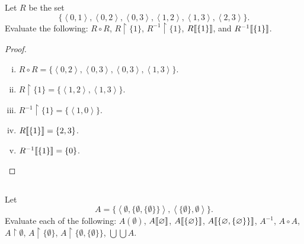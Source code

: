 \documentclass{report}
\begin{document}
\subsection{}%
\label{sub:exercise-3.18}

Let $R$ be the set
  $$\{ \left< 0, 1 \right>, \left< 0, 2 \right>, \left< 0, 3 \right>,
       \left< 1, 2 \right>, \left< 1, 3 \right>, \left< 2, 3 \right>\}.$$
Evaluate the following: $R \circ R$, $R \restriction \{1\}$,
  $R^{-1} \restriction \{1\}$, $R\!\left\llbracket\{1\}\right\rrbracket$, and $R^{-1}\!\left\llbracket\{1\}\right\rrbracket$.

\begin{proof}

  \begin{enumerate}[(i)]
    \item $R \circ R = \{
      \left< 0, 2 \right>,
      \left< 0, 3 \right>,
      \left< 0, 3 \right>,
      \left< 1, 3 \right>
    \}$.
    \item $R \restriction \{1\} = \{
      \left< 1, 2 \right>,
      \left< 1, 3 \right>
    \}$.
    \item $R^{-1} \restriction \{1\} = \{\left< 1, 0 \right>\}$.
    \item $R\!\left\llbracket\{1\}\right\rrbracket = \{2, 3\}$.
    \item $R^{-1}\!\left\llbracket\{1\}\right\rrbracket = \{0\}$.
  \end{enumerate}

\end{proof}

\subsection{}%
\label{sub:exercise-3.19}

Let $$A = \{
  \left< \emptyset, \{\emptyset, \{\emptyset\}\} \right>,
  \left< \{\emptyset\}, \emptyset \right>
  \}.$$
Evaluate each of the following: $A(\emptyset)$, $A\!\left\llbracket\varnothing\right\rrbracket$,
  $A\!\left\llbracket\{\varnothing\}\right\rrbracket$, $A\!\left\llbracket\{\varnothing, \{\varnothing\}\}\right\rrbracket$,
  $A^{-1}$, $A \circ A$, $A \restriction \emptyset$,
  $A \restriction \{\emptyset\}$, $A \restriction \{\emptyset, \{\emptyset\}\}$,
  $\bigcup\bigcup A$.
\end{document}
